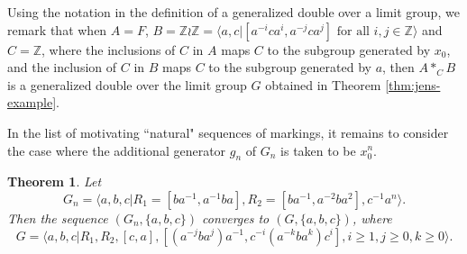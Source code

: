 \documentclass[11pt]{amsart}
\newtheorem{theorem}{Theorem}[section]
\begin{document}
Using the notation in the definition of a generalized double over a limit group, we remark that when
$A = F$, $B = {\mathbb Z} \wr {\mathbb Z} = \langle a,c | [a^{-i}ca^i,a^{-j}ca^j] \text{ for all } i,j \in {\mathbb Z} \rangle$ and $C = {\mathbb Z}$, where the inclusions of $C$ in $A$ maps $C$ to the subgroup generated by $x_0$, and the inclusion of $C$ in $B$ maps $C$ to the subgroup generated by $a$, then $A *_C B$ is a generalized double over the limit group $G$ obtained in Theorem \ref{thm:jens-example}.

In the list of motivating ``natural" sequences of markings, it remains to consider the case where
the additional generator $g_n$ of $G_n$ is taken to be $x_0^n$.

\begin{theorem}\label{thm:x0^n}
Let $$G_n= \langle a, b, c | R_1=[ba^{-1}, a^{-1}ba],
R_2=[ba^{-1}, a^{-2}ba^2], c^{-1}a^{n}\rangle.$$ Then the sequence
$(G_n, \{a,b,c\})$ converges to $(G, \{a,b,c\})$, where $$G=
\langle a,b,c | R_1, R_2,[c,a], [
(a^{-j}ba^j)a^{-1},c^{-i}(a^{-k}ba^k) c^i], i \geq 1, j \geq 0 , k
\geq 0 \rangle .$$
\end{theorem}
\end{document}
